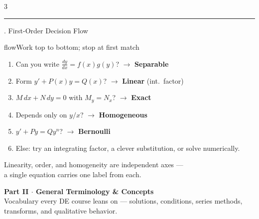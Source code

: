 \documentclass[10pt]{article}
\newcommand{\dydx}{\frac{dy}{dx}}
\newcommand{\sect}[2]{%
  \begin{tcolorbox}[blanker, breakable, before skip=2pt, after skip=2pt]
    \begingroup\sffamily\bfseries\normalsize\color{#1}%
    {\color{#1}\rule[-1pt]{3pt}{12pt}}\;#2\endgroup
    \par\vspace{1pt}{\color{#1}\hrule height 1pt}
\end{tcolorbox}}
\begin{document}
\begin{multicols}{3}
  \sect{flow}{4.\; First-Order Decision Flow}

  \begin{card}{flow}{Work top to bottom; stop at first match}
    \begin{enumerate}[leftmargin=1.4em]
      \item Can you write $\dydx=f(x)g(y)$? $\to$ \textbf{Separable}
      \item Form $y'+P(x)y=Q(x)$? $\to$ \textbf{Linear} (int.\ factor)
      \item $M\,dx+N\,dy=0$ with $M_y=N_x$? $\to$ \textbf{Exact}
      \item Depends only on $y/x$? $\to$ \textbf{Homogeneous}
      \item $y'+Py=Qy^{n}$? $\to$ \textbf{Bernoulli}
      \item Else: try an integrating factor, a clever substitution, or solve numerically.
    \end{enumerate}
  \end{card}

  \begin{tcolorbox}[blanker,before skip=4pt]
    \centering\footnotesize\color{ink!70}
    \sffamily Linearity, order, and homogeneity are independent axes ---\\
    a single equation carries one label from each.
  \end{tcolorbox}

\end{multicols}

\newpage

\begin{tcolorbox}[enhanced, colback=ink, colframe=ink, sharp corners,
  boxrule=0pt, left=12pt, right=12pt, top=5pt, bottom=5pt]
  \color{white}
  {\sffamily\bfseries\LARGE Part II \textmd{\large $\cdot$ General Terminology \& Concepts}}\\[2pt]
  {\sffamily\footnotesize Vocabulary every DE course leans on --- solutions, conditions, series methods, transforms, and qualitative behavior.}
\end{tcolorbox}
\vspace{2pt}
\end{document}
